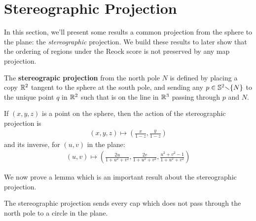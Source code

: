 \section{Stereographic Projection}
In this section, we'll present some results a common
projection from the sphere to the plane: the \textit{stereographic} projection.  
We build these results to 
later show that the  ordering of regions under   the Reock score is not preserved
by any map projection.


\begin{definition}
	The \textbf{stereograpic projection} from the north pole $N$ is
	defined by placing a copy $\mathbb{R}^2$ tangent to the sphere at the south
	pole, and sending any $p\in \mathbb{S}^2{\smallsetminus} \{N\}$ to 
	the unique point $q$ in $\mathbb{R}^2$ such that is on the line in $\mathbb{R}^3$ passing 
	through $p$ and $N$.
	
	If $(x,y,z)$ is a point on the sphere, then the action of the
	stereographic projection is
	\begin{align*}
	(x,y,z)\mapsto \left(\frac{x}{1-z},\frac{y}{1-z}\right)
	\end{align*}
	and its inverse, for $(u,v)$ in the plane:
	\begin{align*}
	(u,v)\mapsto \left( \frac{2u}{1+u^2+v^2},\frac{2v}{1+u^2+v^2},
	\frac{u^2+v^2-1}{1+u^2+v^2}   \right)
	\end{align*}
	
\end{definition}

We now prove a lemma which is an important result about the stereographic projection.


\begin{lemma}
	\label{lem:stereocirc}
  The stereographic projection sends every cap which does not pass
  through the north pole to a circle in the plane.
\end{lemma}

